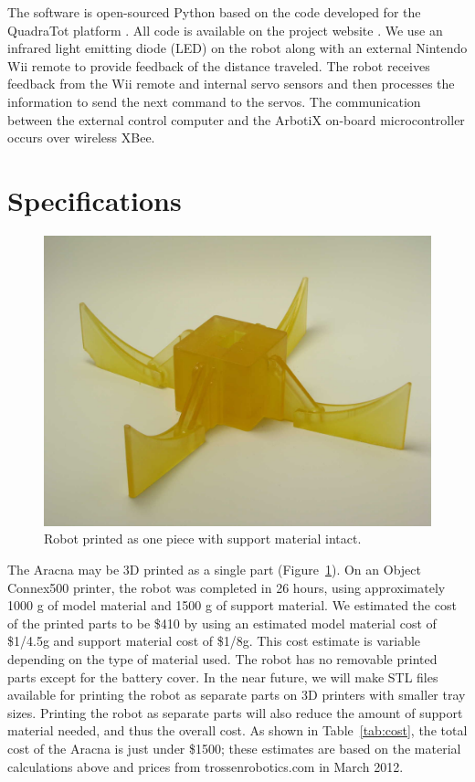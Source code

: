 \documentclass[letterpaper]{article}
\begin{document}
The software is open-sourced Python based on the
code developed for the QuadraTot platform \citep{JY}. All code is
available on the project website \citep{WEB}. We use an infrared light
emitting diode (LED) on the robot along with an external Nintendo Wii
remote to provide feedback of the distance traveled. The robot
receives feedback from the Wii remote and internal servo sensors and
then processes the information to send the next command to
the servos. The communication between the external control computer
and the ArbotiX on-board microcontroller occurs over wireless XBee.



\section{Specifications}

\begin{figure}[t]
\begin{center}
\includegraphics[width=.37\textwidth]{fig2.jpg}
\caption{Robot printed as one piece with support material intact.}
\label{fig2}
\end{center}
\end{figure}

The Aracna may be 3D printed as a single part (Figure~\ref{fig2}). On
an Object Connex500 printer, the robot was completed in 26 hours,
using approximately 1000 g of model material and 1500 g of support
material. We estimated the cost of the printed parts to be \$410 by
using an estimated model material cost of \$1/4.5g and support
material cost of \$1/8g. This cost estimate is variable depending on
the type of material used. The robot has no removable printed parts
except for the battery cover. In the near future, we will make STL files
available for printing the robot as separate parts on
3D printers with smaller tray sizes. Printing the robot as separate parts
will also reduce the amount of support material needed, and thus the
overall cost. As shown in Table~\ref{tab:cost}, the total cost of the
Aracna is just under \$1500; these estimates are based on the material
calculations above and prices from trossenrobotics.com in March 2012.
\end{document}

